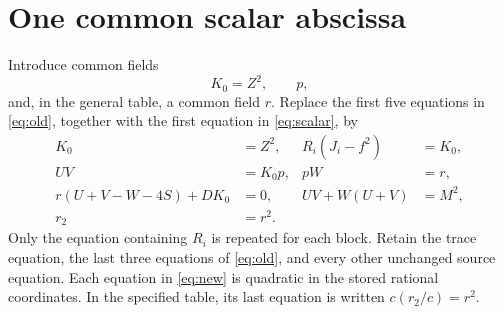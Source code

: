 \documentclass[11pt]{article}
\theoremstyle{remark}\newtheorem{remark}[theorem]{Remark}
\begin{document}
\section{One common scalar abscissa}

Introduce common fields
\[
                         K_0=Z^2,\qquad p,
\]
and, in the general table, a common field \(r\). Replace the first
five equations in \eqref{eq:old}, together with the first equation
in \eqref{eq:scalar}, by
\begin{equation}\label{eq:new}
\begin{aligned}
 K_0&=Z^2,& R_i(\widehat J_i-f^2)&=K_0,\\
 UV&=K_0p,&pW&=r,\\
 r(U+V-W-4S)+DK_0&=0,&UV+W(U+V)&=M^2,\\
 r_2&=r^2.
\end{aligned}
\end{equation}
Only the equation containing \(R_i\) is repeated for each block.
Retain the trace equation, the last three equations of
\eqref{eq:old}, and every other unchanged source equation.
Each equation in \eqref{eq:new} is quadratic in the stored rational
coordinates. In the specified table, its last equation is written
\(c(r_2/c)=r^2\).
\end{document}
